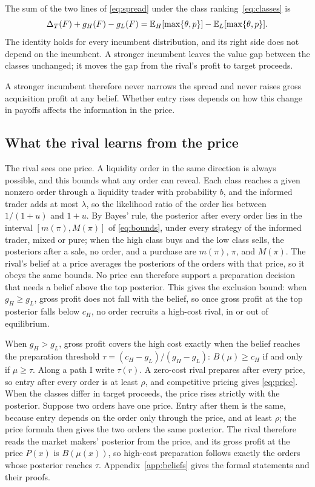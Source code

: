The sum of the two lines of \eqref{eq:spread} under the class ranking~\eqref{eq:classes} is
\[
\Delta_T(F)+g_H(F)-g_L(F)=\mathbb{E}_H[\max\{\theta,p\}]-\mathbb{E}_L[\max\{\theta,p\}].
\]
The identity holds for every incumbent distribution, and its right side does not depend on the incumbent. A
stronger incumbent leaves the value gap between the classes unchanged; it moves the gap from the rival's
profit to target proceeds.

A stronger incumbent therefore never narrows the spread and never raises gross acquisition profit at any belief.
Whether entry rises depends on how this change in payoffs affects the information in the price.

\subsection{What the rival learns from the price}\label{sec:inference}

The rival sees one price. A liquidity order in the same direction is always possible, and this bounds
what any order can reveal. Each class reaches a given nonzero order through a liquidity trader with
probability \(b\), and the informed trader adds at most \(\lambda\), so the likelihood ratio of the order
lies between \(1/(1+u)\) and \(1+u\). By Bayes' rule, the posterior after every order lies in the interval
\([m(\pi),M(\pi)]\) of \eqref{eq:bounds}, under every strategy of the informed trader, mixed or pure; when the high class
buys and the low class sells, the posteriors after a sale, no order, and a purchase are \(m(\pi)\), \(\pi\),
and \(M(\pi)\). The rival's belief at a price averages the posteriors of the orders with that price, so
it obeys the same bounds. No price can therefore support a preparation decision that needs a belief above
the top posterior. This gives the exclusion bound: when \(g_H\ge g_L\), gross profit does not fall with
the belief, so once gross profit at the top posterior falls below \(c_H\), no order recruits a high-cost
rival, in or out of equilibrium.

When \(g_H>g_L\), gross profit covers the high cost exactly when the belief reaches the preparation
threshold \(\tau=(c_H-g_L)/(g_H-g_L)\): \(B(\mu)\ge c_H\) if and only if \(\mu\ge\tau\). Along a path I write
\(\tau(r)\). A zero-cost rival prepares after every price, so entry after every order
is at least \(\rho\), and competitive pricing gives \eqref{eq:price}. When the classes differ in target
proceeds, the price rises strictly with the posterior. Suppose two orders have one price. Entry after them
is the same, because entry depends on the order only through the price, and at least \(\rho\); the price
formula then gives the two orders the same posterior. The rival therefore reads the market makers'
posterior from the price, and its gross profit at the price \(P(x)\) is \(B(\mu(x))\), so high-cost
preparation follows exactly the orders whose posterior reaches \(\tau\).
Appendix~\ref{app:beliefs} gives the formal statements and their proofs.

